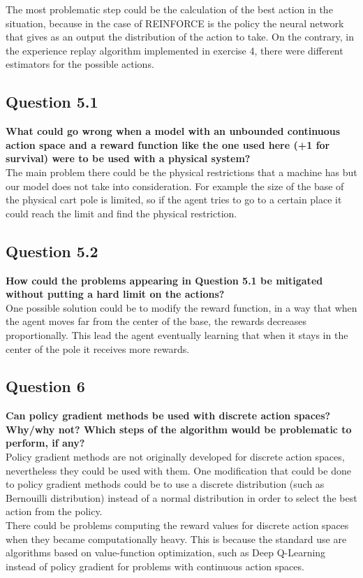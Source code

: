 \documentclass[12pt]{article}
\begin{document}
The most problematic step could be the calculation of the best action in the situation, because in the case of REINFORCE is the policy the neural network that gives as an output the distribution of the action to take. On the contrary, in the experience replay algorithm implemented in exercise 4, there were different estimators for the possible actions.

\subsection{Question 5.1}
\textbf{What could go wrong when a model with an unbounded continuous action space and a reward function like the one used here (+1 for survival) were to be used with a physical system?}\\

The main problem there could be the physical restrictions that a machine has but our model does not take into consideration. For example the size of the base of the physical cart pole is limited, so if the agent tries to go to a certain place it could reach the limit and find the physical restriction.

\subsection{Question 5.2}
\textbf{How could the problems appearing in Question 5.1 be mitigated without putting a hard limit on the actions?}\\

One possible solution could be to modify the reward function, in a way that when the agent moves far from the center of the base, the rewards decreases proportionally. This lead the agent eventually learning that when it stays in the center of the pole it receives more rewards.

\subsection{Question 6}
\textbf{Can policy gradient methods be used with discrete action spaces? Why/why not? Which steps of the algorithm would be problematic to perform, if any? }\\

Policy gradient methods are not originally developed for discrete action spaces, nevertheless they could be used with them. One modification that could be done to policy gradient methods could be to use a discrete distribution (such as Bernouilli distribution) instead of a normal distribution in order to select the best action from the policy. \\

There could be problems computing the reward values for discrete action spaces when they became computationally heavy. This is because the standard use are algorithms based on value-function optimization, such as Deep Q-Learning instead of policy gradient for problems with continuous action spaces.


\end{document}
